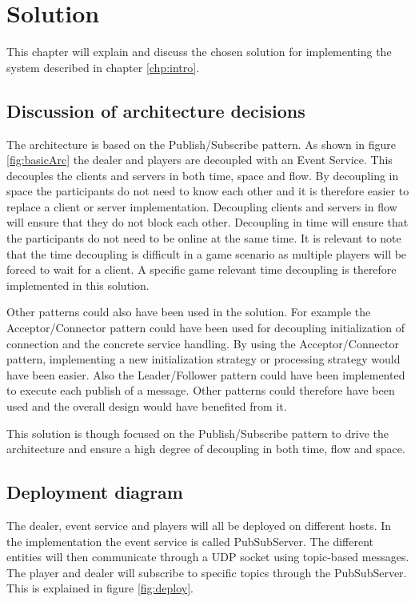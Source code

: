 \chapter{Solution}
This chapter will explain and discuss the chosen solution for implementing the system described in chapter \ref{chp:intro}.

\section{Discussion of architecture decisions}
The architecture is based on the Publish/Subscribe pattern. As shown in figure \ref{fig:basicArc} the dealer and players are decoupled with an Event Service. This decouples the clients and servers in both time, space and flow. By decoupling in space the participants do not need to know each other and it is therefore easier to replace a client or server implementation. Decoupling clients and servers in flow will ensure that they do not block each other. Decoupling in time will ensure that the participants do not need to be online at the same time. It is relevant to note that the time decoupling is difficult in a game scenario as multiple players will be forced to wait for a client. A specific game relevant time decoupling is therefore implemented in this solution.

Other patterns could also have been used in the solution. For example the Acceptor/Connector pattern could have been used for decoupling initialization of connection and the concrete service handling. By using the Acceptor/Connector pattern, implementing a new initialization strategy or processing strategy would have been easier. Also the Leader/Follower pattern could have been implemented to execute each publish of a message. Other patterns could therefore have been used and the overall design would have benefited from it.

This solution is though focused on the Publish/Subscribe pattern to drive the architecture and ensure a high degree of decoupling in both time, flow and space. 

\section{Deployment diagram}
The dealer, event service and players will all be deployed on different hosts. In the implementation the event service is called PubSubServer. The different entities will then communicate through a UDP socket using topic-based messages. The player and dealer will subscribe to specific topics through the PubSubServer. This is explained in figure \ref{fig:deploy}.

